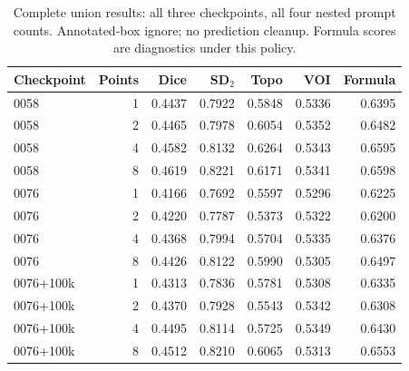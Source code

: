 \begin{table}[t]
\centering
\small
\setlength{\tabcolsep}{4pt}
\begin{tabular}{lrrrrrr}
\toprule
Checkpoint & Points & Dice & SD$_2$ & Topo & VOI & Formula \\
\midrule
0058 & 1 & 0.4437 & 0.7922 & 0.5848 & 0.5336 & 0.6395 \\
0058 & 2 & 0.4465 & 0.7978 & 0.6054 & 0.5352 & 0.6482 \\
0058 & 4 & 0.4582 & 0.8132 & 0.6264 & 0.5343 & 0.6595 \\
0058 & 8 & 0.4619 & 0.8221 & 0.6171 & 0.5341 & 0.6598 \\
0076 & 1 & 0.4166 & 0.7692 & 0.5597 & 0.5296 & 0.6225 \\
0076 & 2 & 0.4220 & 0.7787 & 0.5373 & 0.5322 & 0.6200 \\
0076 & 4 & 0.4368 & 0.7994 & 0.5704 & 0.5335 & 0.6376 \\
0076 & 8 & 0.4426 & 0.8122 & 0.5990 & 0.5305 & 0.6497 \\
0076+100k & 1 & 0.4313 & 0.7836 & 0.5781 & 0.5308 & 0.6335 \\
0076+100k & 2 & 0.4370 & 0.7928 & 0.5543 & 0.5342 & 0.6308 \\
0076+100k & 4 & 0.4495 & 0.8114 & 0.5725 & 0.5349 & 0.6430 \\
0076+100k & 8 & 0.4512 & 0.8210 & 0.6065 & 0.5313 & 0.6553 \\
\bottomrule
\end{tabular}
\caption{Complete union results: all three checkpoints, all four nested prompt counts. Annotated-box ignore; no prediction cleanup. Formula scores are diagnostics under this policy.}
\label{tab:unionmatrix}
\end{table}
